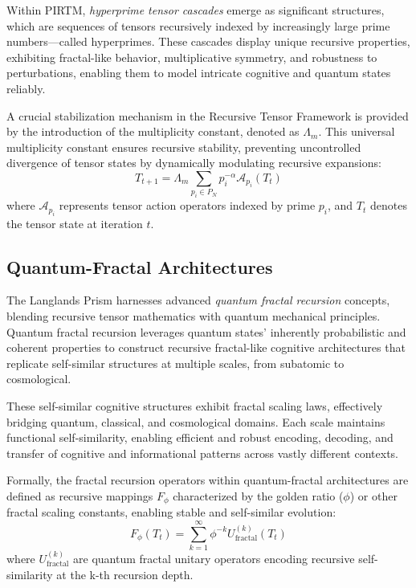 \documentclass[11pt]{article}
\begin{document}
Within PIRTM, \textit{hyperprime tensor cascades} emerge as significant structures, which are sequences of tensors recursively indexed by increasingly large prime numbers—called hyperprimes. These cascades display unique recursive properties, exhibiting fractal-like behavior, multiplicative symmetry, and robustness to perturbations, enabling them to model intricate cognitive and quantum states reliably.

A crucial stabilization mechanism in the Recursive Tensor Framework is provided by the introduction of the multiplicity constant, denoted as \(\Lambda_m\). This universal multiplicity constant ensures recursive stability, preventing uncontrolled divergence of tensor states by dynamically modulating recursive expansions:
\[
T_{t+1} = \Lambda_m \sum_{p_i \in P_N} p_i^{-\alpha} \mathcal{A}_{p_i}(T_t)
\]
where \( \mathcal{A}_{p_i} \) represents tensor action operators indexed by prime \(p_i\), and \(T_t\) denotes the tensor state at iteration \(t\).

\subsection{Quantum-Fractal Architectures}

The Langlands Prism harnesses advanced \textit{quantum fractal recursion} concepts, blending recursive tensor mathematics with quantum mechanical principles. Quantum fractal recursion leverages quantum states' inherently probabilistic and coherent properties to construct recursive fractal-like cognitive architectures that replicate self-similar structures at multiple scales, from subatomic to cosmological.

These self-similar cognitive structures exhibit fractal scaling laws, effectively bridging quantum, classical, and cosmological domains. Each scale maintains functional self-similarity, enabling efficient and robust encoding, decoding, and transfer of cognitive and informational patterns across vastly different contexts.

Formally, the fractal recursion operators within quantum-fractal architectures are defined as recursive mappings \(F_{\phi}\) characterized by the golden ratio (\(\phi\)) or other fractal scaling constants, enabling stable and self-similar evolution:
\[
F_{\phi}(T_t) = \sum_{k=1}^{\infty}\phi^{-k}U_{\text{fractal}}^{(k)}(T_t)
\]
where \(U_{\text{fractal}}^{(k)}\) are quantum fractal unitary operators encoding recursive self-similarity at the k-th recursion depth.
\end{document}
